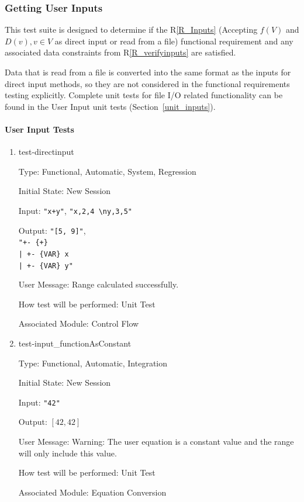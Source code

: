 \documentclass[12pt, titlepage]{article}
\newcommand{\rref}[1]{R\ref{#1}}
\begin{document}
\subsubsection{Getting User Inputs}
\label{tests_gettingInputs}
This test suite is designed to determine if the \rref{R_Inputs} (Accepting 
$f(V)$ and $D(v), v \in V$ as direct input or read from a file) functional 
requirement and any associated data constraints from \rref{R_verifyinputs} are 
satisfied.

Data that is read from a file is converted into the same format as the inputs 
for direct input methods, so they are not considered in the functional 
requirements testing explicitly. Complete unit tests for file I/O related 
functionality can be found in the User Input unit tests 
(Section~\ref{unit_inputs}).

\paragraph{User Input Tests}

\begin{enumerate}
	
	\item{test-directinput}
	
	Type: Functional, Automatic, System, Regression
		
	Initial State: New Session
		
	Input: \texttt{"x+y"}, \texttt{"x,2,4 \textbackslash ny,3,5"}
		
	Output: \texttt{"[5, 9]"}, \\
	\texttt{"+- \{+\}\\
		|     +- \{VAR\} x\\
		|     +- \{VAR\} y"}
		
	User Message: Range calculated successfully.
		
	How test will be performed: Unit Test
		
	Associated Module: Control Flow\\
	
	\item{test-input\_functionAsConstant}
	
	Type: Functional, Automatic, Integration
	
	Initial State: New Session
	
	Input: \texttt{"42"}
	
	Output:	$[42,42]$
	
	User Message: Warning: The user equation is a constant value and the range 
	will only include this value.
	
	How test will be performed: Unit Test
	
	Associated Module: Equation Conversion\\
\end{enumerate}
\end{document}
